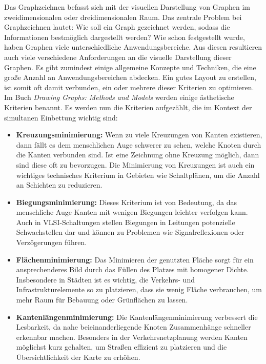 \documentclass[bachelor, german]{algothesis}
\begin{document}
Das Graphzeichnen befasst sich mit der visuellen Darstellung von Graphen im zweidimensionalen oder dreidimensionalen Raum. Das zentrale Problem bei Graphzeichnen lautet: Wie soll ein Graph gezeichnet werden, sodass die Informationen bestmöglich dargestellt werden? Wie schon festgestellt wurde, haben Graphen viele unterschiedliche Anwendungsbereiche. Aus diesen resultieren auch viele verschiedene Anforderungen an die visuelle Darstellung dieser Graphen.\newline
Es gibt zumindest einige allgemeine Konzepte und Techniken, die eine große Anzahl an Anwendungsbereichen abdecken. Ein gutes Layout zu erstellen, ist somit oft damit verbunden, ein oder mehrere dieser Kriterien zu optimieren. Im Buch \textit{Drawing Graphs: Methods and Models} \cite{DrawingMeth} werden einige ästhetische Kriterien benannt. Es werden nun die Kriterien aufgezählt, die im Kontext der simultanen Einbettung wichtig sind: 
\begin{itemize}
    \item  \textbf{Kreuzungsminimierung:} Wenn zu viele Kreuzungen von Kanten existieren, dann fällt es dem menschlichen Auge schwerer zu sehen, welche Knoten durch die Kanten verbunden sind. Ist eine Zeichnung ohne Kreuzung möglich, dann sind diese oft zu bevorzugen. Die Minimierung von Kreuzungen ist auch ein wichtiges technisches Kriterium in Gebieten wie Schaltplänen, um die Anzahl an Schichten zu reduzieren.
    \item  \textbf{Biegungsminimierung:} Dieses Kriterium ist von Bedeutung, da das menschliche Auge Kanten mit wenigen Biegungen leichter verfolgen kann. Auch in VLSI-Schaltungen stellen Biegungen in Leitungen potenzielle Schwachstellen dar und können zu Problemen wie Signalreflexionen oder Verzögerungen führen.
    \item  \textbf{Flächenminimierung:} Das Minimieren der genutzten Fläche sorgt für ein ansprechenderes Bild durch das Füllen des Platzes mit homogener Dichte. Insbesondere in Städten ist es wichtig, die Verkehrs- und Infrastrukturelemente so zu platzieren, dass sie wenig Fläche verbrauchen, um mehr Raum für Bebauung oder Grünflächen zu lassen.
    \item  \textbf{Kantenlängenminimierung:} Die Kantenlängenminimierung verbessert die Lesbarkeit, da nahe beieinanderliegende Knoten Zusammenhänge schneller erkennbar machen. Besonders in der Verkehrsnetzplanung werden Kanten möglichst kurz gehalten, um Straßen effizient zu platzieren und die Übersichtlichkeit der Karte zu erhöhen.
\end{itemize}
\end{document}
